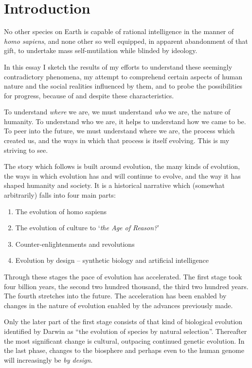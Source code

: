 \documentclass[10pt,titlepage]{article}
\begin{document}
\section{Introduction}

No other species on Earth is capable of rational intelligence in the manner of \emph{homo sapiens}, and none other so well equipped, in apparent abandonment of that gift, to undertake mass self-mutilation while blinded by ideology.

In this essay I sketch the results of my efforts to understand these seemingly contradictory phenomena, my attempt to comprehend certain aspects of human nature and the social realities influenced by them, and to probe the possibilities for progress, because of and despite these characteristics.

To understand \emph{where} we are, we must understand \emph{who} we are, the nature of humanity.
To understand who we are, it helps to understand how we came to be.
To peer into the future, we must understand where we are, the process which created us, and the ways in which that process is itself evolving.
This is my striving to see.

The story which follows is built around evolution, the many kinds of evolution, the ways in which evolution has and will continue to evolve, and the way it has shaped humanity and society.
It is a historical narrative which (somewhat arbitrarily) falls into four main parts:

\begin{enumerate}
\item The evolution of homo sapiens
\item The evolution of culture to `\emph{the Age of Reason?}' 
\item Counter-enlightenments and revolutions
\item Evolution by design -- synthetic biology and artificial intelligence
\end{enumerate}

Through these stages the pace of evolution has accelerated.
The first stage took four billion years, the second two hundred thousand, the third two hundred years.
The fourth stretches into the future.
The acceleration has been enabled by changes in the nature of evolution enabled by the advances previously made.

Only the later part of the first stage consists of that kind of biological evolution identified by Darwin as ``the evolution of species by natural selection''.
Thereafter the most significant change is cultural, outpacing continued genetic evolution.
In the last phase, changes to the biosphere and perhaps even to the human genome will increasingly be {\it by design}.
\end{document}
